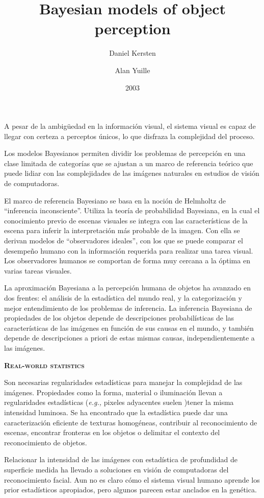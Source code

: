 \documentclass[a4paper,12pt]{article}
\title{Bayesian models of object perception}
\author{Daniel Kersten \and Alan Yuille}
\date{2003}
\begin{document}
{\scshape\bfseries \maketitle}

A pesar de la ambigüedad en la información visual, el sistema visual es capaz de llegar con certeza a perceptos únicos, lo que disfraza la complejidad del proceso.

Los modelos Bayesianos permiten dividir los problemas de percepción en una clase limitada de categorías que se ajustan a un marco de referencia teórico que puede lidiar con las complejidades de las imágenes naturales en estudios de visión de computadoras.

El marco de referencia Bayesiano se basa en la noción de Helmholtz de ``inferencia inconsciente''. Utiliza la teoría de probabilidad Bayesiana, en la cual el conocimiento previo de escenas visuales se integra con las características de la escena para inferir la interpretación más probable de la imagen. Con ella se derivan modelos de ``observadores ideales'', con los que se puede comparar el desempeño humano con la información requerida para realizar una tarea visual. Los observadores humanos se comportan de forma muy cercana a la óptima en varias tareas visuales.

La aproximación Bayesiana a la percepción humana de objetos ha avanzado en dos frentes: el análisis de la estadística del mundo real, y la categorización y mejor entendimiento de los problemas de inferencia. La inferencia Bayesiana de propiedades de los objetos depende de descripciones probabilísticas de las características de las imágenes en función de sus causas en el mundo, y también depende de descripciones a priori de estas mismas causas, independientemente a las imágenes.

{\scshape\bfseries Real-world statistics}

Son necesarias regularidades estadísticas para manejar la complejidad de las imágenes. Propiedades como la forma, material o iluminación llevan a regularidades estadísticas ({\itshape e.g.,} pixeles adyacentes suelen )tener la misma intensidad luminosa. Se ha encontrado que la estadística puede dar una caracterización eficiente de texturas homogéneas, contribuir al reconocimiento de escenas, encontrar fronteras en los objetos o delimitar el contexto del reconocimiento de objetos.

Relacionar la intensidad de las imágenes con estadística de profundidad de superficie medida ha llevado a soluciones en visión de computadoras del reconocimiento facial. Aun no es claro cómo el sistema visual humano aprende los prior estadísticos apropiados, pero algunos parecen estar anclados en la genética.
\end{document}
